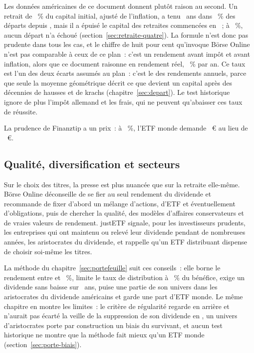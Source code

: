 Les donn\'ees am\'ericaines de ce document donnent plut\^ot raison au second. Un retrait de
\TauxRetrait~\% du capital initial, ajust\'e de l'inflation, a tenu \RetraitHistAnsVierzig~ans dans
\RetraitHistReussiteVierzig~\% des d\'eparts depuis \RetraitHistPremierVierzig, mais il a \'epuis\'e le
capital des retraites commenc\'ees en \RetraitHistEchecsListeVierzig~; \`a \TauxRetraitPrudent~\%,
aucun d\'epart n'a \'echou\'e (section~\ref{sec:retraite-quatre}). La formule n'est donc pas prudente
dans tous les cas, et le chiffre de huit pour cent qu'invoque B\"orse Online n'est pas comparable \`a
ceux de ce plan~: c'est un rendement avant imp\^ot et avant inflation, alors que ce document raisonne en
rendement r\'eel, \RenditeReal~\% par an. Ce taux est l'un des deux \'ecarts assum\'es au plan~: c'est
le \RenditeReelleConvention{} des rendements annuels, parce que seule la moyenne g\'eom\'etrique d\'ecrit
ce que devient un capital apr\`es des d\'ecennies de hausses et de krachs (chapitre~\ref{sec:depart}).
Le test historique ignore de plus l'imp\^ot allemand et les frais, qui ne peuvent qu'abaisser ces taux
de r\'eussite.

La prudence de Finanztip a un prix~: \`a \TauxRetraitPrudent~\%, l'ETF monde demande
\KapitalEtfPrudent~€ au lieu de \KapitalEtfReferenz~€. 

\subsection{Qualit\'e, diversification et secteurs}\label{sec:presse-selection}

Sur le choix des titres, la presse est plus nuanc\'ee que sur la retraite elle-m\^eme. B\"orse Online
d\'econseille de se fier au seul rendement du dividende et recommande de fixer d'abord un m\'elange
d'actions, d'ETF et \'eventuellement d'obligations, puis de chercher la qualit\'e, des mod\`eles
d'affaires conservateurs et de vraies valeurs de rendement. justETF signale, pour les investisseurs
prudents, les entreprises qui ont maintenu ou relev\'e leur dividende pendant de nombreuses ann\'ees,
les aristocrates du dividende, et rappelle qu'un ETF distribuant dispense de choisir soi-m\^eme les
titres.

La m\'ethode du chapitre~\ref{sec:portefeuille} suit ces conseils~: elle borne le rendement entre
\RegleRendementMin{} et \RegleRendementMax~\%, limite le taux de distribution \`a \ReglePayoutMax~\% du
b\'en\'efice, exige un dividende sans baisse sur \RegleAnneesCroissance~ans, puise une partie de son
univers dans les aristocrates du dividende am\'ericains et garde une part d'ETF monde. Le m\^eme
chapitre en montre les limites~: le crit\`ere de r\'egularit\'e regarde en arri\`ere et n'aurait pas
\'ecart\'e \BeispielBaisse{} la veille de la suppression de son dividende en \BeispielBaisseAnnee, un
univers d'aristocrates porte par construction un biais du survivant, et aucun test historique ne
montre que la m\'ethode fait mieux qu'un ETF monde (section~\ref{sec:porte-biais}).

